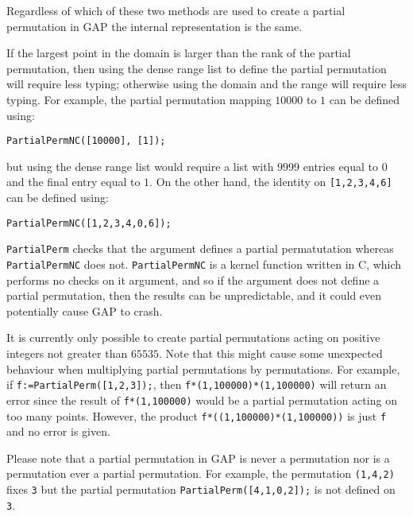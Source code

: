 \documentclass[a4paper,11pt]{report}
\begin{document}
{{{ Regardless of which of these two methods are used to create a partial
permutation in \textsf{GAP} the internal representation is the same. 

 If the largest point in the domain is larger than the rank of the partial
permutation, then using the dense range list to define the partial permutation
will require less typing; otherwise using the domain and the range will
require less typing. For example, the partial permutation mapping $10000$ to $1$ can be defined using: 
\begin{Verbatim}[commandchars=!@|,fontsize=\small,frame=single,label=Example]
  PartialPermNC([10000], [1]);
\end{Verbatim}
 but using the dense range list would require a list with $9999$ entries equal to $0$ and the final entry equal to $1$. On the other hand, the identity on \texttt{[1,2,3,4,6]} can be defined using: 
\begin{Verbatim}[commandchars=!@|,fontsize=\small,frame=single,label=Example]
  PartialPermNC([1,2,3,4,0,6]);
\end{Verbatim}
 

 \texttt{PartialPerm} checks that the argument defines a partial permatutation whereas \texttt{PartialPermNC} does not. \texttt{PartialPermNC} is a kernel function written in C, which performs no checks on it argument,
and so if the argument does not define a partial permutation, then the results
can be unpredictable, and it could even potentially cause \textsf{GAP} to crash. 

 It is currently only possible to create partial permutations acting on
positive integers not greater than $65535$. Note that this might cause some unexpected behaviour when multiplying
partial permutations by permutations. For example, if \texttt{f:=PartialPerm([1,2,3]);}, then \texttt{f*(1,100000)*(1,100000)} will return an error since the result of \texttt{f*(1,100000)} would be a partial permutation acting on too many points. However, the product \texttt{f*((1,100000)*(1,100000))} is just \texttt{f} and no error is given. 

 Please note that a partial permutation in \textsf{GAP} is never a permutation nor is a permutation ever a partial permutation. For
example, the permutation \texttt{(1,4,2)} fixes \texttt{3} but the partial permutation \texttt{PartialPerm([4,1,0,2]);} is not defined on \texttt{3}. }

 

}}
\end{document}
